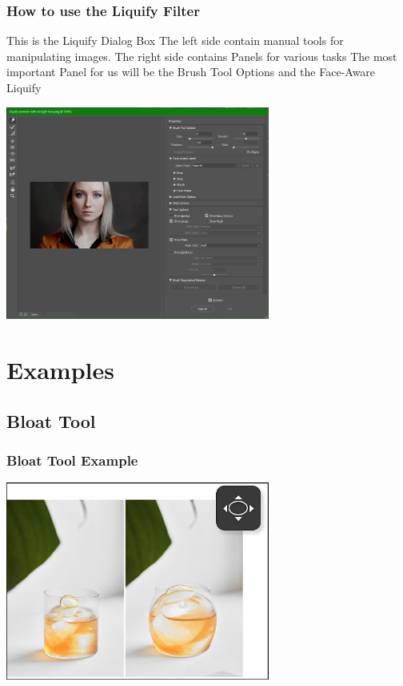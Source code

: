 \documentclass{beamer}
\begin{document}
	\begin{frame}
	\frametitle{How to use the Liquify Filter}
	\begin{outline}
		\1 This is the Liquify Dialog Box
		\1 The left side contain manual tools for manipulating images.
		\1 The right side contains Panels for various tasks
		\2 The most important Panel for us will be the Brush Tool Options and the Face-Aware Liquify
	\end{outline}
	\begin{center}
	\includegraphics[width=0.65\textwidth]{images/liquify dialog box.png}
\end{center}
\end{frame}


\section{Examples}

\subsection{Bloat Tool}		
\begin{frame}
	\frametitle{Bloat Tool Example}
	\begin{center}
	\includegraphics[width=0.65\textwidth]{images/liquify - bloat.png}
\end{center}
\end{frame}
\end{document}
